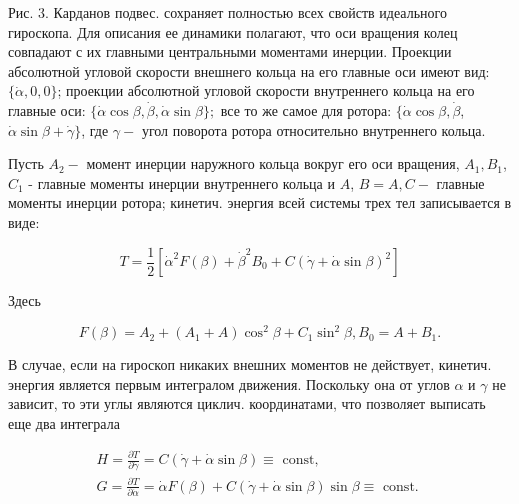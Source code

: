 \documentclass[10pt]{article}
\begin{document}
Рис. 3. Карданов подвес. сохраняет полностью всех свойств идеального гироскопа. Для описания ее динамики полагают, что оси вращения колец совпадают с их главными центральными моментами инерции. Проекции абсолютной угловой скорости внешнего кольца на его главные оси имеют вид: $\{\dot{\alpha}, 0,0\}$; проекции абсолютной угловой скорости внутреннего кольца на его главные оси: $\{\dot{\alpha} \cos \beta, \dot{\beta}, \dot{\alpha} \sin \beta\} ;$ все то же самое для ротора: $\{\dot{\alpha} \cos \beta, \dot{\beta}$, $\dot{\alpha} \sin \beta+\dot{\gamma}\}$, где $\gamma-$ угол поворота ротора относительно внутреннего кольца.



Пусть $A_{2}-$ момент инерции наружного кольца вокруг его оси вращения, $A_{1}, B_{1}$, $C_{1}$ - главные моменты инерции внутреннего кольца и $A$, $B=A, C-$ главные моменты инерции ротора; кинетич. энергия всей системы трех тел записывается в виде:



\[

T=\frac{1}{2}\left[\dot{\alpha}^{2} F(\beta)+\dot{\beta}^{2} B_{0}+C(\dot{\gamma}+\dot{\alpha} \sin \beta)^{2}\right]

\]



Здесь



\[

F(\beta)=A_{2}+\left(A_{1}+A\right) \cos ^{2} \beta+C_{1} \sin ^{2} \beta, B_{0}=A+B_{1} .

\]



В случае, если на гироскоп никаких внешних моментов не действует, кинетич. энергия является первым интегралом движения. Поскольку она от углов $\alpha$ и $\gamma$ не зависит, то эти углы являются циклич. координатами, что позволяет выписать еще два интеграла



\[

\begin{array}{r}

H=\frac{\partial T}{\partial \dot{\gamma}}=C(\dot{\gamma}+\dot{\alpha} \sin \beta) \equiv \text { const, } \\

G=\frac{\partial T}{\partial \dot{\alpha}}=\dot{\alpha} F(\beta)+C(\dot{\gamma}+\dot{\alpha} \sin \beta) \sin \beta \equiv \text { const. }

\end{array}

\]
\end{document}

